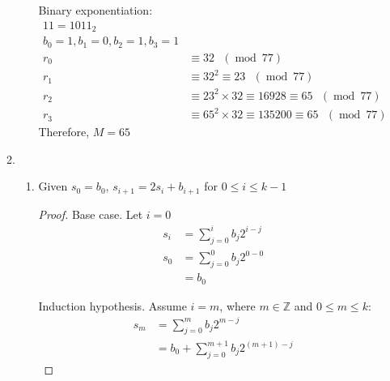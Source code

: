 \documentclass[11pt]{article}
\theoremstyle{definition}
\renewcommand{\pmod}[1]{\mbox{\ $(\ensuremath{\operatorname{mod}}\ {#1})$}}
\newcommand{\Z}{\mathbb{Z}}
\begin{document}
\begin{enumerate}
\begin{enumerate}
\begin{enumerate}
        Binary exponentiation:
        \begin{align*}
          11 = 1011_{2} \\
          b_0 = 1, b_1 = 0, b_2 = 1, b_3 = 1 \\
          r_0 &\equiv 32 \pmod{77} \\
          r_1 &\equiv 32^2 \equiv 23 \pmod{77} \\
          r_2 &\equiv 23^2 \times 32 \equiv 16928 \equiv 65 \pmod{77} \\
          r_3 &\equiv 65^2 \times 32 \equiv 135200 \equiv 65 \pmod{77}
        \end{align*}
        Therefore, $M = 65$
    \end{enumerate}
  \item
    \begin{enumerate}
      \item
        Given $s_0 = b_0$, $s_{i + 1} = 2s_i + b_{i + 1}$ for $0 \leq i \leq k - 1$
        \begin{proof}
          Base case. Let $i = 0$
          \begin{align*}
            s_i &= \sum^{i}_{j = 0} b_j 2^{i - j} \\
            s_0 &= \sum^{0}_{j = 0} b_j2^{0 - 0} \\
                &= b_0
          \end{align*}

          Induction hypothesis. Assume $i = m$, where $m \in \Z$ and $0 \leq m \leq k$:
          \begin{align*}
            s_m &= \sum^{m}_{j = 0} b_j2^{m - j} \\
                &= b_0 + \sum^{m + 1}_{j = 0} b_j 2^{(m + 1) - j}
          \end{align*}


\end{proof}
\end{enumerate}
\end{enumerate}
\end{enumerate}
\end{document}
